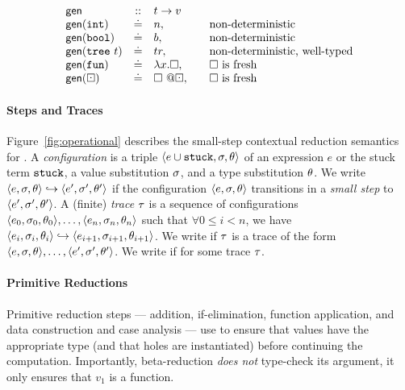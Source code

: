 $$
\begin{array}{lcll}
\gensym       & ::      & t \rightarrow v \\
\gen{\tint}   & \defeq  & n, & \quad \text{non-deterministic} \\
\gen{\tbool}  & \defeq  & b, & \quad \text{non-deterministic} \\
\gen{\ttree{t}}  & \defeq  & tr, & \quad \text{non-deterministic, well-typed} \\
\gen{\tfun}   & \defeq & \efun{x}{\ehole}, & \quad \text{\ehole is fresh} \\
\gen{\thole}  & \defeq & \vhole{\thole}, & \quad \text{\ehole is fresh} \\
\end{array}
$$

\paragraph{Steps and Traces}

%
Figure~\ref{fig:operational} describes the small-step contextual
reduction semantics for \lang.
%
A \emph{configuration} is a triple $\langle e \cup \mathtt{stuck}, \sigma, \theta \rangle$
of an expression $e$ or the stuck term $\mathtt{stuck}$, a value substitution
$\sigma$, and a type substitution $\theta$.
%
We write $\langle e, \sigma, \theta \rangle \hookrightarrow \langle e', \sigma', \theta' \rangle$ if the configuration
$\langle e, \sigma, \theta \rangle$ transitions in a \emph{small step} to
$\langle e', \sigma', \theta' \rangle$.
%
A (finite) \emph{trace} $\tau$ is a sequence of configurations
$\langle e_0, \sigma_0, \theta_0 \rangle, \ldots, \langle e_n, \sigma_n, \theta_n \rangle$ such that
$\forall 0 \leq i < n$, we have
$\langle e_i, \sigma_i, \theta_i \rangle \hookrightarrow \langle e_{i+1}, \sigma_{i+1}, \theta_{i+1} \rangle$.
%
We write  if $\tau$ is
a trace of the form $\langle e, \sigma, \theta \rangle,\ldots,\langle e', \sigma', \theta' \rangle$.
%
We write  if
 for some trace $\tau$.

\paragraph{Primitive Reductions}
Primitive reduction steps --- addition, if-elimination, function
application, and data construction and case analysis --- use \forcesym
to ensure that values have the appropriate type (and that holes are
instantiated) before continuing the computation. Importantly,
beta-reduction \emph{does not} type-check its argument, it only ensures
that $v_1$ is a function.

